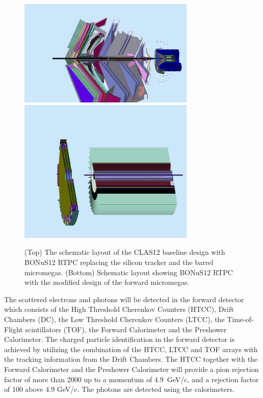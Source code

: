 \begin{figure}
  \begin{center}
    \includegraphics[angle=0, width=0.75\textwidth]{figures/clas12_bonus12.png}
    \includegraphics[angle=0, width=0.75\textwidth]{figures/bonus12_fmt.png}
     \caption{(Top) The schematic layout of the CLAS12 baseline design with 
     BONuS12 RTPC replacing the silicon tracker and the barrel micromegas.  
     (Bottom) Schematic layout showing BONuS12 RTPC with the modified design of 
     the forward micromegas.}
    \label{fig:fd}
  \end{center}
\end{figure}

The scattered electrons and photons will be detected in the forward detector which consists 
of the High Threshold Cherenkov Counters (HTCC), Drift Chambers (DC), the Low 
Threshold Cherenkov Counters (LTCC), the Time-of-Flight scintillators (TOF), 
the Forward Calorimeter and the Preshower Calorimeter. The charged particle 
identification in the forward detector is achieved by utilizing the combination 
of the HTCC, LTCC and TOF arrays with the tracking information from the Drift 
Chambers. The HTCC together with the Forward Calorimeter and the Preshower 
Calorimeter will provide a pion rejection factor of more than 2000 up to a 
momentum of 4.9~GeV/c, and a rejection factor of 100 above 4.9 GeV/c. The photons
are detected using the calorimeters.

